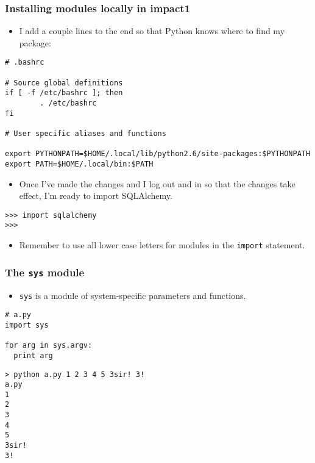 \documentclass[handout]{beamer}
\numberwithin{equation}{section}
\begin{document}
\begin{frame}[fragile]
\frametitle{Installing modules locally in impact1}

\begin{itemize}
\item I add a couple lines to the end so that Python knows where to find my package:
\end{itemize}

\begin{lstlisting}[name=bashrc]
# .bashrc                                                                                                             

# Source global definitions                                                                                           
if [ -f /etc/bashrc ]; then
        . /etc/bashrc
fi

# User specific aliases and functions                                                                                 

export PYTHONPATH=$HOME/.local/lib/python2.6/site-packages:$PYTHONPATH
export PATH=$HOME/.local/bin:$PATH
\end{lstlisting}
\pause

\begin{itemize}
\item Once I've made the changes and I log out and in so that the changes take effect, I'm ready to import SQLAlchemy.
\end{itemize}

\begin{lstlisting}[name=ex2]
>>> import sqlalchemy
>>>
\end{lstlisting}

\pause
\begin{itemize}
\item Remember to use all lower case letters for modules in the {\tt import} statement.
\end{itemize}
\end{frame}




\begin{frame}[fragile]
\frametitle{The {\tt sys} module}

\begin{itemize}
\item {\tt sys} is a module of system-specific parameters and functions.
\end{itemize}

\begin{lstlisting}[name=ex2]
# a.py
import sys

for arg in sys.argv:
  print arg
\end{lstlisting}

\pause
\begin{lstlisting}[name=ex2]
> python a.py 1 2 3 4 5 3sir! 3!
a.py
1
2
3
4
5
3sir!
3!
\end{lstlisting}
\end{frame}
\end{document}
